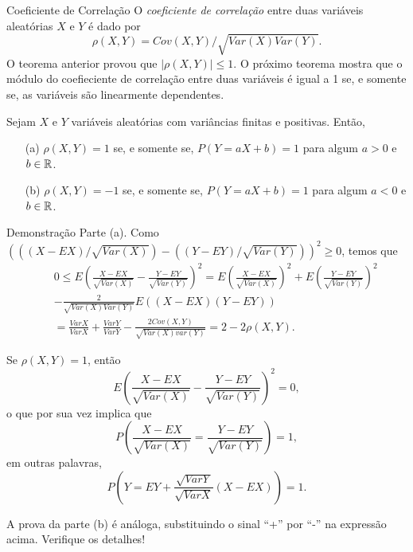 \begin{frame}{Coeficiente de Correlação}
%
%
O {\em coeficiente de correlação} entre duas variáveis aleatórias $X$ e $Y$ é dado por
$$\rho(X,Y)={Cov(X,Y)}/{\sqrt{Var(X)Var(Y)}}.$$
O teorema anterior provou que $|\rho(X,Y)|\leq 1$. O próximo teorema mostra que o módulo do coefieciente de correlação entre duas variáveis é igual a 1 se, e somente se, as variáveis são linearmente dependentes.
%
\begin{teo}
Sejam $X$ e $Y$ variáveis aleatórias com variâncias finitas e positivas. Então,
\begin{enumerate}
\item[(a)] $\rho(X,Y)=1$ se, e somente se, $P(Y=aX+b)=1$ para algum $a>0$ e $b\in \mathbb{R}$.
\item[(b)] $\rho(X,Y)=-1$ se, e somente se, $P(Y=aX+b)=1$ para algum $a<0$ e $b\in \mathbb{R}$.
\end{enumerate}
\end{teo}
%
\begin{block}{Demonstração}
Parte (a). Como $(({(X-EX)}/{\sqrt{Var(X)}})-({(Y-EY)}/{\sqrt{Var(Y)}}))^2\geq 0$, temos que
\begin{eqnarray}
& & 0\leq E(\frac{X-EX}{\sqrt{Var(X)}}-\frac{Y-EY}{\sqrt{Var(Y)}})^2  = E(\frac{X-EX}{\sqrt{Var(X)}})^2+E(\frac{Y-EY}{\sqrt{Var(Y)}})^2\nonumber\\
& & -\frac{2}{\sqrt{Var(X)Var(Y)}}E((X-EX)(Y-EY)) \nonumber \\
& & =\frac{Var X}{Var X}+\frac{Var Y}{Var Y}-\frac{2Cov(X,Y)}{\sqrt{Var(X)var(Y)}}=2-2\rho(X,Y). \nonumber
\end{eqnarray}
\end{block}
\end{frame}
%
\begin{frame}
\begin{block}{}
%
Se $\rho(X,Y)=1$, então
$$E(\frac{X-EX}{\sqrt{Var(X)}}-\frac{Y-EY}{\sqrt{Var(Y)}})^2=0,$$
o que por sua vez implica que
$$P(\frac{X-EX}{\sqrt{Var(X)}}=\frac{Y-EY}{\sqrt{Var(Y)}})=1,$$
em outras palavras,
$$P(Y=EY+\frac{\sqrt{Var Y}}{\sqrt{Var X}}(X-EX))=1.$$

A prova da parte (b) é análoga, substituindo o sinal ``+'' por ``-'' na expressão acima. Verifique os detalhes!
\end{block}
\end{frame}

